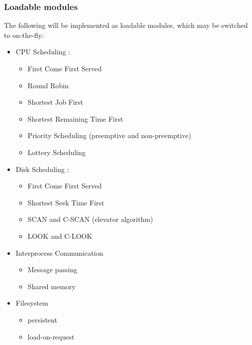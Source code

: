 \documentclass[10pt,a4paper]{article}
\begin{document}
\subsubsection{Loadable modules}
The following will be implemented as loadable modules, which may be switched to
on-the-fly:
\begin{itemize}
    \item CPU Scheduling \cite{DinosaurCPU}:
        \begin{itemize}
            \item First Come First Served
            \item Round Robin
            \item Shortest Job First
            \item Shortest Remaining Time First
            \item Priority Scheduling (preemptive and non-preemptive)
            \item Lottery Scheduling
        \end{itemize}
    \item Disk Scheduling \cite{DinosaurDisk}:
        \begin{itemize}
            \item First Come First Served
            \item Shortest Seek Time First
            \item SCAN and C-SCAN (elevator algorithm)
            \item LOOK and C-LOOK
        \end{itemize}
    \item Interprocess Communication
        \begin{itemize}
            \item Message passing
            \item Shared memory
        \end{itemize}
    \item Filesystem
        \begin{itemize}
            \item persistent
            \item load-on-request
        \end{itemize}
\end{itemize}
\end{document}
